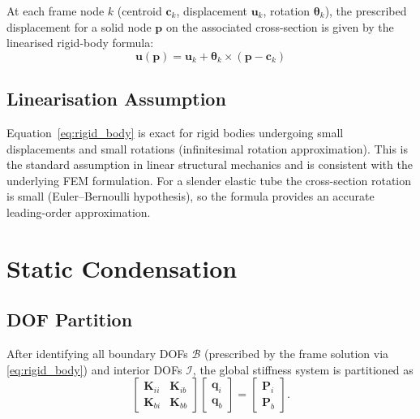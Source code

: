 \documentclass{article}
\begin{document}
At each frame node $k$ (centroid $\bm{c}_k$, displacement $\bm{u}_k$,
rotation $\bm{\theta}_k$), the prescribed displacement for a solid node
$\bm{p}$ on the associated cross-section is given by the linearised
rigid-body formula:
\begin{equation}
    \boxed{\bm{u}(\bm{p}) = \bm{u}_k + \bm{\theta}_k \times (\bm{p} - \bm{c}_k)}
    \label{eq:rigid_body}
\end{equation}

\subsection{Linearisation Assumption}

Equation~\eqref{eq:rigid_body} is exact for rigid bodies undergoing
small displacements and small rotations (infinitesimal rotation
approximation).  This is the standard assumption in linear structural
mechanics and is consistent with the underlying FEM formulation.  For a
slender elastic tube the cross-section rotation is small (Euler--Bernoulli
hypothesis), so the formula provides an accurate leading-order approximation.

\section{Static Condensation}
\label{sec:condensation}

\subsection{DOF Partition}

After identifying all boundary DOFs $\mathcal{B}$ (prescribed by the frame
solution via \eqref{eq:rigid_body}) and interior DOFs $\mathcal{I}$, the
global stiffness system is partitioned as
\begin{equation}
    \begin{bmatrix} \bm{K}_{ii} & \bm{K}_{ib} \\ \bm{K}_{bi} & \bm{K}_{bb} \end{bmatrix}
    \begin{bmatrix} \bm{q}_i \\ \bm{q}_b \end{bmatrix}
    =
    \begin{bmatrix} \bm{P}_i \\ \bm{P}_b \end{bmatrix}.
\end{equation}
\end{document}
